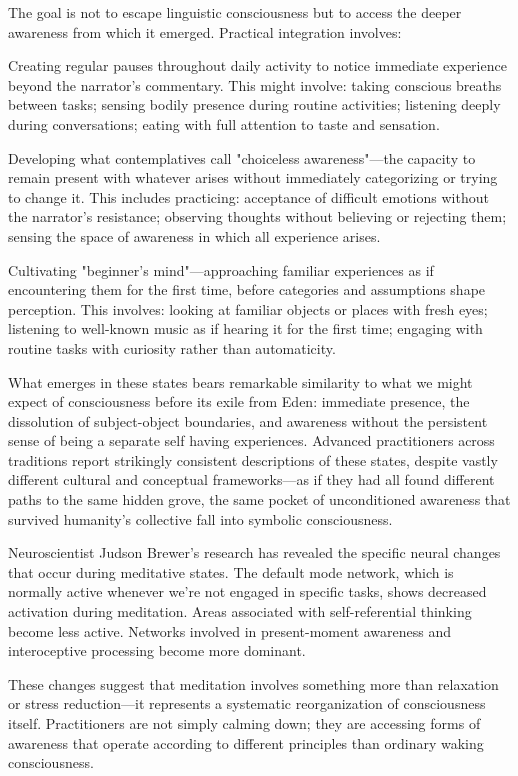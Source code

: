 The goal is not to escape linguistic consciousness but to access the deeper awareness from which it emerged. Practical integration involves:

Creating regular pauses throughout daily activity to notice immediate experience beyond the narrator's commentary. This might involve: taking conscious breaths between tasks; sensing bodily presence during routine activities; listening deeply during conversations; eating with full attention to taste and sensation.

Developing what contemplatives call "choiceless awareness"—the capacity to remain present with whatever arises without immediately categorizing or trying to change it. This includes practicing: acceptance of difficult emotions without the narrator's resistance; observing thoughts without believing or rejecting them; sensing the space of awareness in which all experience arises.

Cultivating "beginner's mind"—approaching familiar experiences as if encountering them for the first time, before categories and assumptions shape perception. This involves: looking at familiar objects or places with fresh eyes; listening to well-known music as if hearing it for the first time; engaging with routine tasks with curiosity rather than automaticity.

What emerges in these states bears remarkable similarity to what we might expect of consciousness before its exile from Eden: immediate presence, the dissolution of subject-object boundaries, and awareness without the persistent sense of being a separate self having experiences. Advanced practitioners across traditions report strikingly consistent descriptions of these states, despite vastly different cultural and conceptual frameworks—as if they had all found different paths to the same hidden grove, the same pocket of unconditioned awareness that survived humanity's collective fall into symbolic consciousness.

Neuroscientist Judson Brewer's research has revealed the specific neural changes that occur during meditative states. The default mode network, which is normally active whenever we're not engaged in specific tasks, shows decreased activation during meditation. Areas associated with self-referential thinking become less active. Networks involved in present-moment awareness and interoceptive processing become more dominant.

These changes suggest that meditation involves something more than relaxation or stress reduction—it represents a systematic reorganization of consciousness itself. Practitioners are not simply calming down; they are accessing forms of awareness that operate according to different principles than ordinary waking consciousness.

